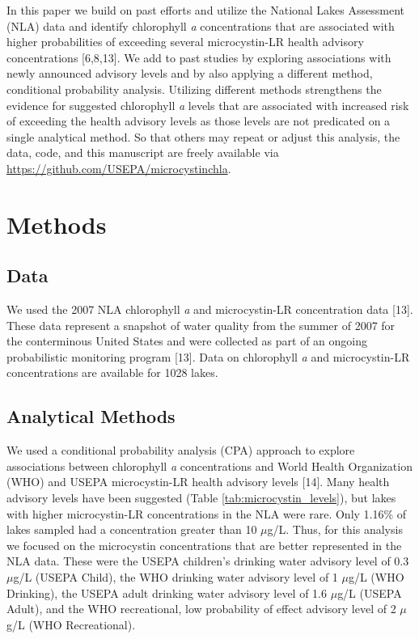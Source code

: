 \documentclass[10pt,a4paper,twocolumn]{article}
\begin{document}
In this paper we build on past efforts and utilize the National Lakes
Assessment (NLA) data and identify chlorophyll \emph{a} concentrations
that are associated with higher probabilities of exceeding several
microcystin-LR health advisory concentrations {[}6,8,13{]}. We add to
past studies by exploring associations with newly announced advisory
levels and by also applying a different method, conditional probability
analysis. Utilizing different methods strengthens the evidence for
suggested chlorophyll \emph{a} levels that are associated with increased
risk of exceeding the health advisory levels as those levels are not
predicated on a single analytical method. So that others may repeat or
adjust this analysis, the data, code, and this manuscript are freely
available via
\href{https://github.com/USAPE/microcystinchla}{\url{https://github.com/USEPA/microcystinchla}}.

\section{Methods}\label{methods}

\subsection{Data}\label{data}

We used the 2007 NLA chlorophyll \emph{a} and microcystin-LR
concentration data {[}13{]}. These data represent a snapshot of water
quality from the summer of 2007 for the conterminous United States and
were collected as part of an ongoing probabilistic monitoring program
{[}13{]}. Data on chlorophyll \emph{a} and microcystin-LR concentrations
are available for 1028 lakes.

\subsection{Analytical Methods}\label{analytical-methods}

We used a conditional probability analysis (CPA) approach to explore
associations between chlorophyll \emph{a} concentrations and World
Health Organization (WHO) and USEPA microcystin-LR health advisory
levels {[}14{]}. Many health advisory levels have been suggested (Table
\ref{tab:microcystin_levels}), but lakes with higher microcystin-LR
concentrations in the NLA were rare. Only 1.16\% of lakes sampled had a
concentration greater than 10 \(\mu\)g/L. Thus, for this analysis we
focused on the microcystin concentrations that are better represented in
the NLA data. These were the USEPA children's drinking water advisory
level of 0.3 \(\mu\)g/L (USEPA Child), the WHO drinking water advisory
level of 1 \(\mu\)g/L (WHO Drinking), the USEPA adult drinking water
advisory level of 1.6 \(\mu\)g/L (USEPA Adult), and the WHO
recreational, low probability of effect advisory level of 2 \(\mu\)g/L
(WHO Recreational).
\end{document}
